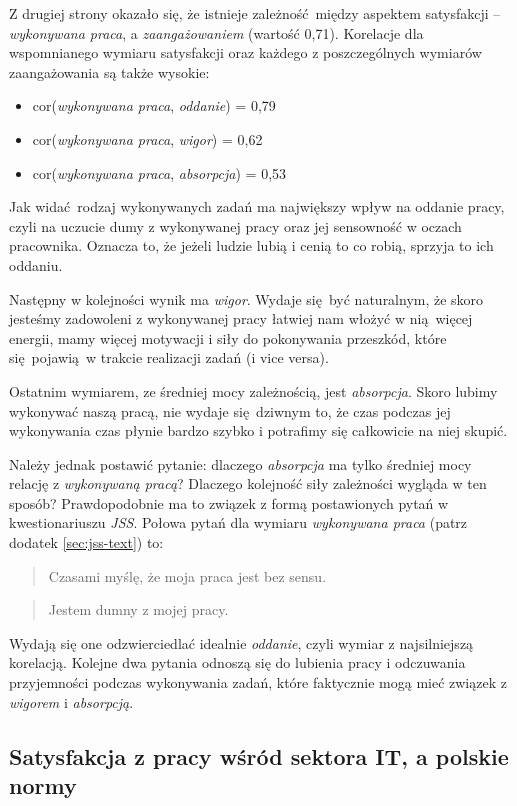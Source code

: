 Z drugiej strony okazało się, że istnieje zależność między aspektem satysfakcji --\textit{wykonywana praca}, a \textit{zaangażowaniem} (wartość 0,71). Korelacje dla wspomnianego wymiaru satysfakcji oraz każdego z poszczególnych wymiarów zaangażowania są także wysokie:
\begin{itemize}
  \item cor(\textit{wykonywana praca}, \textit{oddanie}) = 0,79
  \item cor(\textit{wykonywana praca}, \textit{wigor}) = 0,62
  \item cor(\textit{wykonywana praca}, \textit{absorpcja}) = 0,53
\end{itemize}
Jak widać rodzaj wykonywanych zadań ma największy wpływ na oddanie pracy, czyli na uczucie dumy z wykonywanej pracy oraz jej sensowność w oczach pracownika. Oznacza to, że jeżeli ludzie lubią i cenią to co robią, sprzyja to ich oddaniu. 

Następny w kolejności wynik ma \textit{wigor}. Wydaje się być naturalnym, że skoro jesteśmy zadowoleni z wykonywanej pracy łatwiej nam włożyć w nią więcej energii, mamy więcej motywacji i siły do pokonywania przeszkód, które się pojawią w trakcie
realizacji zadań (i vice versa). 

Ostatnim wymiarem, ze średniej mocy zależnością, jest \textit{absorpcja}. Skoro lubimy wykonywać naszą pracą, nie wydaje się dziwnym to, że czas podczas jej wykonywania czas płynie bardzo szybko i potrafimy się całkowicie na niej skupić. 

Należy jednak postawić pytanie: dlaczego \textit{absorpcja} ma tylko średniej mocy relację z \textit{wykonywaną pracą}? Dlaczego kolejność siły zależności wygląda w ten sposób? Prawdopodobnie ma to związek z formą postawionych pytań w kwestionariuszu \emph{JSS}. Połowa pytań dla wymiaru \textit{wykonywana praca} (patrz dodatek \ref{sec:jss-text}) to:
\begin{quote}
  Czasami myślę, że moja praca jest bez sensu.
\end{quote}
\begin{quote}
  Jestem dumny z mojej pracy.
\end{quote}
Wydają się one odzwierciedlać idealnie \textit{oddanie}, czyli wymiar z najsilniejszą korelacją. Kolejne dwa pytania odnoszą się do lubienia pracy i odczuwania przyjemności podczas wykonywania zadań, które faktycznie mogą mieć związek z \textit{wigorem} i \textit{absorpcją}.


\subsection{Satysfakcja z pracy wśród sektora IT, a polskie normy}
